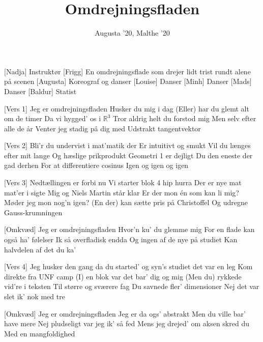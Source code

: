 \documentclass[a4paper,11pt]{article}
\title{Omdrejningsfladen}
\author{Augusta '20, Malthe '20}
\begin{document}
\maketitle

\begin{roles}
[Nadja] Instruktør
[Frigg] En omdrejningsflade som drejer lidt trist rundt alene på scenen
[Augusta] Koreograf og danser
[Louise] Danser
[Minh] Danser
[Mads] Danser
[Baldur] Statist
\end{roles}

\begin{song}
[Vers 1] Jeg er omdrejningsfladen 
Husker du mig i dag
(Eller) har du glemt alt om de timer 
Da vi hygged’ os i $\mathbb{R}^3$ 
Tror aldrig helt du forstod mig
Men selv efter alle de år 
Venter jeg stadig på dig med
Udstrakt tangentvektor 

[Vers 2] Bli’r du undervist i mat’matik der 
Er intuitivt og smukt 
Vil du længes efter mit lange 
Og hæslige prikprodukt  
Geometri 1 er dejligt 
Du den eneste der gad derhen 
For at differentiere cosinus
Igen og igen og igen 

[Vers 3] Nedtællingen er forbi nu 
Vi starter blok 4 hip hurra 
Der er nye mat mat’er i sigte 
Mig og Niels Martin står klar
Er der mon én som kan li mig? 
Møder jeg mon nog'n igen?
(En der) kan sætte pris på Christoffel 
Og udregne Gauss-krumningen

[Omkvæd] Jeg er omdrejningsfladen 
Hvor'n ku' du glemme mig 
For en flade kan også ha' følelser 
Ik så overfladisk endda 
Og ingen af de nye på studiet 
Kan halvdelen af det du ka'

[Vers 4] Jeg husker den gang da du started'
og syn's studiet det var en leg
Kom direkte fra UNF camp 
(I) en blok var det bar' dig og mig   
(Men du) rykkede vid're i teksten 
Til større og sværere fag 
Du savnede fler' dimensioner 
Nej det var slet ik' nok med tre

[Omkvæd] Jeg er omdrejningsfladen 
Jeg er da ogs' abstrakt
Men du ville bar' have mere
Nej pludseligt var jeg ik' så fed
Mens jeg drejed' om aksen skred du 
Med en mangfoldighed
\end{song}
\end{document}
